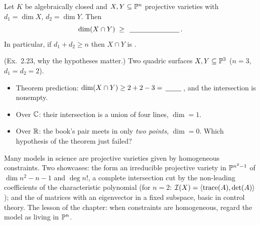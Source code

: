 
\begin{theorem}\label{thm:intersect}
Let $K$ be algebraically closed and $X,Y\subseteq\PP^n$ projective varieties with $d_1=\dim X$,
$d_2=\dim Y$. Then
\[
  \dim(X\cap Y)\;\ge\; \fillin[2.5cm].
\]
In particular, if $d_1+d_2\ge n$ then $X\cap Y$ is \fillin[2.5cm].
\end{theorem}

\begin{yourturn}
(Ex.\ 2.23, why the hypotheses matter.) Two quadric surfaces $X,Y\subseteq\PP^3$ ($n=3$, $d_1=d_2=2$).
\begin{itemize}[leftmargin=1.3em,itemsep=1pt]
  \item Theorem prediction: $\dim(X\cap Y)\ge 2+2-3=\fillin[0.8cm]$, and the intersection is nonempty.
  \item Over $\C$: their intersection is a union of four lines, $\dim=1$. \checkmark
  \item Over $\R$: the book's pair meets in only \emph{two points}, $\dim=0$. Which hypothesis of the
        theorem just failed? \fillin[3cm]
\end{itemize}
\end{yourturn}

\begin{strand}
Many models in science are projective varieties given by homogeneous constraints. Two showcases:
the  form an irreducible projective variety in $\PP^{n^2-1}$ of
$\dim n^2-n-1$ and $\deg n!$, a complete intersection cut by the non-leading coefficients of the
characteristic polynomial (for $n=2$: $\Ideal(X)=\gen{\operatorname{trace}(A),\det(A)}$); and the
 of matrices with an eigenvector in a fixed subspace, basic in control theory.
The lesson of the chapter: when constraints are homogeneous, regard the model as living in $\PP^n$.
\end{strand}

